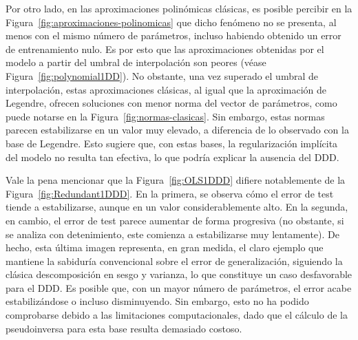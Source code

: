 Por otro lado, en las aproximaciones polinómicas clásicas, es posible percibir en la Figura~\ref{fig:aproximaciones-polinomicas} que dicho fenómeno no se presenta, al menos con el mismo número de parámetros, incluso habiendo obtenido un error de entrenamiento nulo. Es por esto que las aproximaciones obtenidas por el modelo a partir del umbral de interpolación son peores (véase Figura~\ref{fig:polynomial1DD}). No obstante, una vez superado el umbral de interpolación, estas aproximaciones clásicas, al igual que la aproximación de Legendre, ofrecen soluciones con menor norma del vector de parámetros, como puede notarse en la Figura~\ref{fig:normas-clasicas}. Sin embargo, estas normas parecen estabilizarse en un valor muy elevado, a diferencia de lo observado con la base de Legendre. Esto sugiere que, con estas bases, la regularización implícita del modelo no resulta tan efectiva, lo que podría explicar la ausencia del DDD.

Vale la pena mencionar que la Figura~\ref{fig:OLS1DDD} difiere notablemente de la Figura~\ref{fig:Redundant1DDD}. En la primera, se observa cómo el error de test tiende a estabilizarse, aunque en un valor considerablemente alto. En la segunda, en cambio, el error de test parece aumentar de forma progresiva (no obstante, si se analiza con detenimiento, este comienza a estabilizarse muy lentamente). De hecho, esta última imagen representa, en gran medida, el claro ejemplo que mantiene la sabiduría convencional sobre el error de generalización, siguiendo la clásica descomposición en sesgo y varianza, lo que constituye un caso desfavorable para el DDD. Es posible que, con un mayor número de parámetros, el error acabe estabilizándose o incluso disminuyendo. Sin embargo, esto no ha podido comprobarse debido a las limitaciones computacionales, dado que el cálculo de la pseudoinversa para esta base resulta demasiado costoso.


